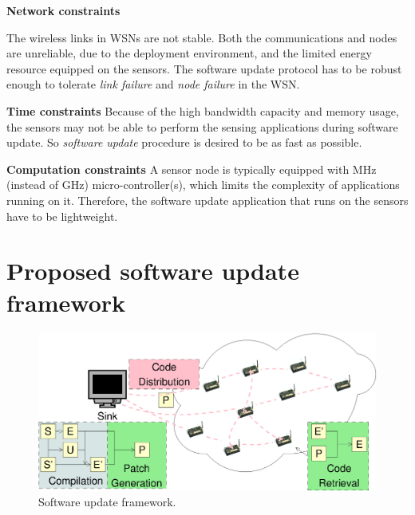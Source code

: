 
\textbf{Network constraints}

The wireless links in WSNs are not stable. Both the communications and nodes are unreliable, due to the deployment environment, and the limited energy resource equipped on the sensors. The software update protocol has to be robust enough to tolerate {\em link failure} and {\em node failure} in the WSN.


\textbf{Time constraints}
Because of the high bandwidth capacity and memory usage, the sensors may not be able to perform the sensing applications during software update. So {\it software update} procedure is desired to be as fast as possible. 

\textbf{Computation constraints}
A sensor node is typically equipped with MHz (instead of GHz) micro-controller(s), which limits the complexity of  applications running on it. Therefore, the software update application that runs on the sensors have to be lightweight.



\section{Proposed software update framework}

\begin{figure}[htbp]
	\centering
		\includegraphics[scale=0.5]{figures/model.eps}
	\caption{Software update framework.}
	\label{fig:overview}
\end{figure}

